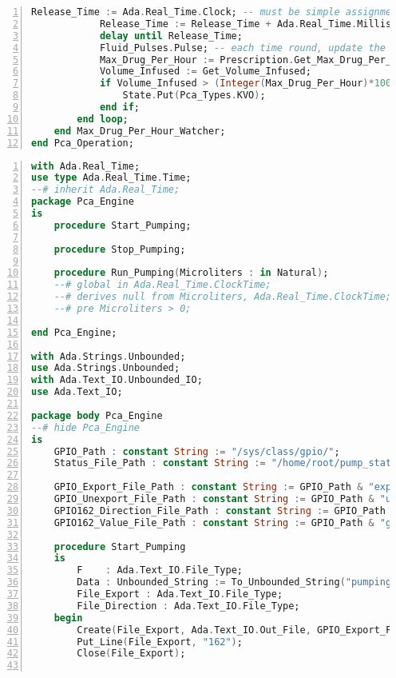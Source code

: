 \begin{lstlisting}[language=ada, gobble=0, numbers=left, caption={\lstinline{Pca_Operation} package}, label={listing:pca_ravenscar:pca_operation}]
            Release_Time := Ada.Real_Time.Clock; -- must be simple assignment
            Release_Time := Release_Time + Ada.Real_Time.Milliseconds(Period);
            delay until Release_Time;
            Fluid_Pulses.Pulse; -- each time round, update the volume infused moving window
            Max_Drug_Per_Hour := Prescription.Get_Max_Drug_Per_Hour;
            Volume_Infused := Get_Volume_Infused;
            if Volume_Infused > (Integer(Max_Drug_Per_Hour)*1000) then -- convert to microliters
                State.Put(Pca_Types.KVO);
            end if;
        end loop;
    end Max_Drug_Per_Hour_Watcher;
end Pca_Operation;
\end{lstlisting} 
\doublespacing


\singlespacing
\begin{lstlisting}[language=ada, gobble=0, numbers=left, caption={\lstinline{Pca_Engine} package}, label={listing:pca_ravenscar:pca_engine}]
with Ada.Real_Time;
use type Ada.Real_Time.Time;
--# inherit Ada.Real_Time;
package Pca_Engine
is
    procedure Start_Pumping;

    procedure Stop_Pumping;

    procedure Run_Pumping(Microliters : in Natural);
    --# global in Ada.Real_Time.ClockTime;
    --# derives null from Microliters, Ada.Real_Time.ClockTime;
    --# pre Microliters > 0;

end Pca_Engine;

with Ada.Strings.Unbounded;
use Ada.Strings.Unbounded;
with Ada.Text_IO.Unbounded_IO;
use Ada.Text_IO;

package body Pca_Engine
--# hide Pca_Engine
is
    GPIO_Path : constant String := "/sys/class/gpio/";
    Status_File_Path : constant String := "/home/root/pump_status.txt";

    GPIO_Export_File_Path : constant String := GPIO_Path & "export";
    GPIO_Unexport_File_Path : constant String := GPIO_Path & "unexport";
    GPIO162_Direction_File_Path : constant String := GPIO_Path & "gpio162/direction";
    GPIO162_Value_File_Path : constant String := GPIO_Path & "gpio162/value";

    procedure Start_Pumping
    is
        F    : Ada.Text_IO.File_Type;
        Data : Unbounded_String := To_Unbounded_String("pumping");
        File_Export : Ada.Text_IO.File_Type;
        File_Direction : Ada.Text_IO.File_Type;
    begin
        Create(File_Export, Ada.Text_IO.Out_File, GPIO_Export_File_Path);
        Put_Line(File_Export, "162");
        Close(File_Export);


\end{lstlisting}
